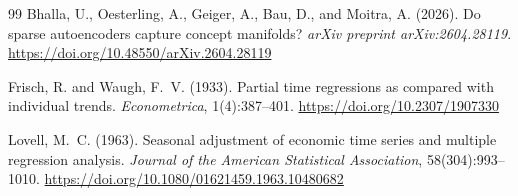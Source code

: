 \documentclass[11pt,a4paper]{article}
\begin{document}
\begin{thebibliography}{99}
Bhalla, U., Oesterling, A., Geiger, A., Bau, D., and Moitra, A. (2026).
Do sparse autoencoders capture concept manifolds?
\textit{arXiv preprint arXiv:2604.28119}.
\url{https://doi.org/10.48550/arXiv.2604.28119}

Frisch, R. and Waugh, F.~V. (1933).
Partial time regressions as compared with individual trends.
\textit{Econometrica}, 1(4):387--401.
\url{https://doi.org/10.2307/1907330}

Lovell, M.~C. (1963).
Seasonal adjustment of economic time series and multiple regression analysis.
\textit{Journal of the American Statistical Association}, 58(304):993--1010.
\url{https://doi.org/10.1080/01621459.1963.10480682}

\end{thebibliography}
\end{document}
